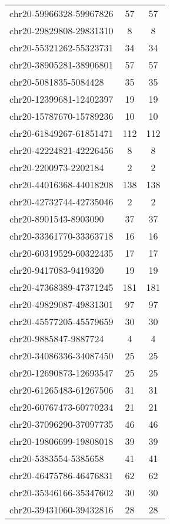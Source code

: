 \documentclass[10pt,letterpaper]{article}
\begin{document}
{\begin{longtable}{lSS}
	chr20-59966328-59967826 & 57     & 57       \\
	chr20-29829808-29831310 & 8      & 8        \\
	chr20-55321262-55323731 & 34     & 34       \\
	chr20-38905281-38906801 & 57     & 57       \\
	chr20-5081835-5084428   & 35     & 35       \\
	chr20-12399681-12402397 & 19     & 19       \\
	chr20-15787670-15789236 & 10     & 10       \\
	chr20-61849267-61851471 & 112    & 112      \\
	chr20-42224821-42226456 & 8      & 8        \\
	chr20-2200973-2202184   & 2      & 2        \\
	chr20-44016368-44018208 & 138    & 138      \\
	chr20-42732744-42735046 & 2      & 2        \\
	chr20-8901543-8903090   & 37     & 37       \\
	chr20-33361770-33363718 & 16     & 16       \\
	chr20-60319529-60322435 & 17     & 17       \\
	chr20-9417083-9419320   & 19     & 19       \\
	chr20-47368389-47371245 & 181    & 181      \\
	chr20-49829087-49831301 & 97     & 97       \\
	chr20-45577205-45579659 & 30     & 30       \\
	chr20-9885847-9887724   & 4      & 4        \\
	chr20-34086336-34087450 & 25     & 25       \\
	chr20-12690873-12693547 & 25     & 25       \\
	chr20-61265483-61267506 & 31     & 31       \\
	chr20-60767473-60770234 & 21     & 21       \\
	chr20-37096290-37097735 & 46     & 46       \\
	chr20-19806699-19808018 & 39     & 39       \\
	chr20-5383554-5385658   & 41     & 41       \\
	chr20-46475786-46476831 & 62     & 62       \\
	chr20-35346166-35347602 & 30     & 30       \\
	chr20-39431060-39432816 & 28     & 28       \\

\end{longtable}}
\end{document}
